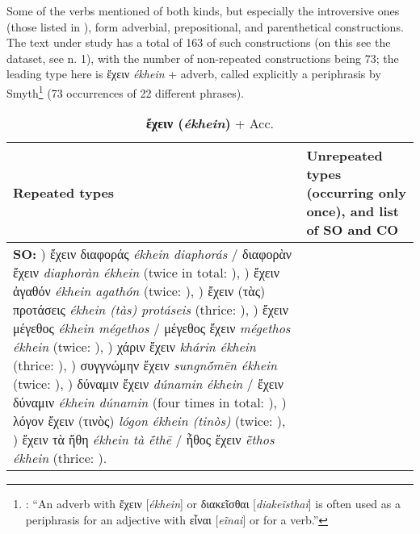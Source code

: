 \documentclass[output=paper,colorlinks,citecolor=brown]{langscibook}
\begin{document}
Some of the verbs mentioned of both kinds, but especially the introversive ones (those listed in ), form adverbial, prepositional, and parenthetical constructions. The text under study has a total of 163 of such constructions (on this see the dataset, see n. 1), with the number of non-repeated constructions being 73; the leading type here is ἔχειν \textit{ékhein} + adverb, called explicitly a periphrasis by Smyth\footnote{\citet[§1438]{Smyth1920}: “An adverb with ἔχειν [\textit{ékhein}] or διακεῖσθαι [\textit{diakeĩsthai}] is often used as a periphrasis for an adjective with εἶναι [\textit{eĩnai}] or for a verb.”} (73 occurrences of 22 different phrases).


\begin{table}
\caption{\textbf{ἔχειν (\textit{ékhein})} + Acc. }\label{tab:startexampledata2}
\footnotesize
\begin{tabularx}{\textwidth}{QQ}
        \lsptoprule
        Repeated types%
        & Unrepeated types (occurring only once), and list of SO and CO     \\
        \midrule
\textbf{SO:}
) ἔχειν διαφοράς \textit{ékhein diaphorás} / διαφορὰν ἔχειν \textit{diaphoràn ékhein} (twice in total: ),
) ἔχειν ἀγαθόν \textit{ékhein agathón} (twice: ),
) ἔχειν (τὰς) προτάσεις  \textit{ékhein (tàs) protáseis} (thrice: ),
) ἔχειν μέγεθος \textit{ékhein mégethos} / μέγεθος ἔχειν \textit{mégethos ékhein} (twice: ),
) χάριν ἔχειν \textit{khárin ékhein} (thrice: ),
) συγγνώμην ἔχειν \textit{sungnṓmēn ékhein} (twice: ),
) δύναμιν ἔχειν \textit{dúnamin ékhein} / ἔχειν δύναμιν \textit{ékhein dúnamin} (four times in total: ),
) λόγον ἔχειν (τινὸς) \textit{lógon ékhein (tinòs)} (twice: ),
) ἔχειν τὰ ἤθη \textit{ékhein tà ḗthē} / ἦθος ἔχειν \textit{ē̃thos ékhein} (thrice: ). \newline


\end{tabularx}
\end{table}
\end{document}
